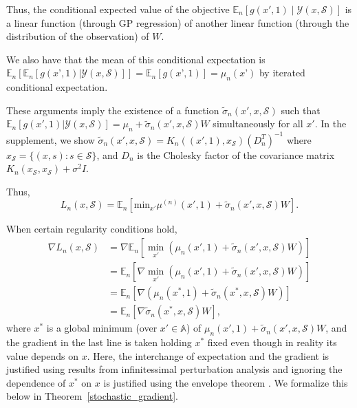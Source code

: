 \documentclass[letterpaper]{article}
\newcommand{\E}{\mathbb{E}}
\providecommand{\diag}{{\rm diag}}
\numberwithin{equation}{section}
\newcommand{\pfcomment}[1]{{\color{blue} PF: #1}}
\renewcommand{\S}{\mathcal{S}}
\newcommand{\Y}{\mathcal{Y}}
\newcommand{\loss}{L}
\begin{document}
Thus, the conditional expected value of the objective $\E_n\left[g(x',1) \mid \Y(x,\S)\right]$ is a linear function (through GP regression) of another linear function (through the distribution of the observation) of $W$.

We also have that the mean of this conditional expectation is
$\E_n[\E_n[g(x’,1) | \Y(x,\S) ] ] =
\E_n[g(x’,1) ] = \mu_n(x’)$ by iterated conditional expectation.

These arguments imply the existence of a function $\tilde{\sigma}_n(x',x,\S)$ such that
$\E_n[g(x',1) | \Y(x,\S)]
= \mu_n + \tilde{\sigma}_n(x',x,\S) W$ simultaneously for all $x'$.
In the supplement, we show 
$\tilde{\sigma}_n(x',x,\S)= K_n\left((x', 1), x_{\S}\right) (D_{n}^T)^{-1}$
where $x_\mathcal{S} = \{(x, s): s \in \mathcal{S}\}$, and $D_{n}$ is the Cholesky factor of the covariance matrix $K_n\left(x_\mathcal{S}, x_\mathcal{S}\right)+\sigma^2 I$.


Thus, 
\begin{equation*}
\loss_{n}\left(x,\S\right)=\mathbb{E}_{n}\left[\mbox{min}_{x'} \mu^{\left(n\right)}\left(x',1\right)+\tilde{\sigma}_{n}\left(x', x, \S\right)W\right].
\end{equation*}


When certain regularity conditions hold,
\begin{align*}
\nabla \loss_n(x,\S)
&= \nabla \mathbb{E}_{n}\left[\min_{x'}\left(\mu_n\left(x',1\right)+\tilde{\sigma}_{n}\left(x', x, \S\right)W\right)\right]\\
&= \mathbb{E}_{n}\left[\nabla \min_{x'}\left(\mu_n\left(x',1\right)+\tilde{\sigma}_{n}\left(x', x, \S\right)W\right)\right]\\
&= \mathbb{E}_{n}\left[\nabla \left(\mu_n\left(x^*,1\right)+\tilde{\sigma}_{n}\left(x^*, x, \S\right)W\right)\right]\\
&= \mathbb{E}_{n}\left[\nabla \tilde{\sigma}_{n}\left(x^*, x, \S\right)W\right],
\end{align*}
where $x^*$ is a global minimum (over $x'\in \mathbb{A}$) of $\mu_n(x',1) + \tilde{\sigma}_n(x',x,\S)W$, and the gradient in the last line is taken holding $x^*$ fixed even though in reality its value depends on $x$.
Here, the interchange of expectation and the gradient is justified using results from infinitessimal perturbation analysis \citep{l1990unified} and ignoring the dependence of $x^*$ on $x$ is justified using the envelope theorem \citep{milgrom2002envelope}.
We formalize this below in Theorem~\ref{stochastic_gradient}.
\end{document}
